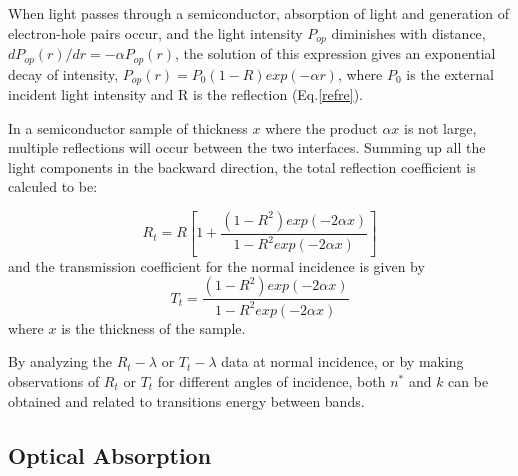 \documentclass[%
reprint,
amsmath,amssymb,
aps,
]{revtex4-1}
\begin{document}
	When light passes through a semiconductor, absorption of light and generation of electron-hole pairs occur, and the light intensity $  P_{op} $ diminishes with distance, $ d P_{op}(r)/dr = - \alpha P_{op}(r)$, the solution of this expression gives an exponential decay of intensity, $ P_{op}(r) =P_0 (1-R)exp(- \alpha r)$, where $ P_0 $ is the external incident light intensity and R is the reflection (Eq.\ref{refre}).
	
	In a semiconductor sample of thickness $ x $ where the product $ \alpha x $ is not large, multiple reflections will occur between the two interfaces. Summing up all the light components in the backward direction, the total reflection coefficient is calculed to be:
	
	\begin{equation}
		R_t = R[1 + \dfrac{(1 - R^2)exp(-2\alpha x)}{1 - R^2exp(-2\alpha x)}]
		\label{refre}
	\end{equation}
	and the transmission coefficient for the normal incidence is given by
	\begin{equation}
		T_t = \dfrac{(1 - R^2)exp(-2\alpha x)}{1 - R^2exp(-2\alpha x)}
	\end{equation}
	where $ x $ is the thickness of the sample.
	
	By analyzing the $ R_t - \lambda $ or $ T_t - \lambda $ data at normal incidence, or by making observations of $ R_t $ or $ T_t $ for different angles of incidence, both $ n^* $ and $ k $ can be obtained and related to transitions energy between bands.
	
	\subsection{Optical Absorption}
	
\end{document}
